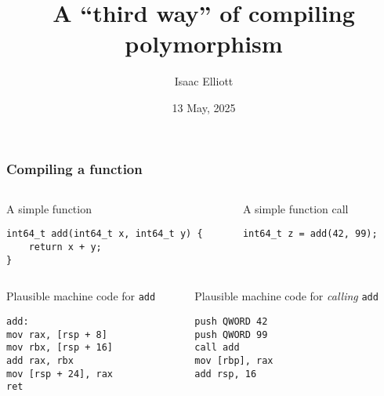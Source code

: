 \documentclass[t]{beamer}
\title{A ``third way'' of compiling polymorphism}
\author{Isaac Elliott}
\date{13 May, 2025}
\begin{document}
\frame{\titlepage}


\begin{frame}[fragile]
\frametitle{Compiling a function}

\begin{columns}
\begin{column}{0.48\textwidth}
\begin{block}{A simple function}
\footnotesize
\begin{verbatim}
int64_t add(int64_t x, int64_t y) {
    return x + y;
}
\end{verbatim}
\end{block}
\end{column}

\begin{column}{0.48\textwidth}
\begin{block}{A simple function call}
\begin{verbatim}
int64_t z = add(42, 99);
\end{verbatim}
\end{block}
\end{column}
\end{columns}

\begin{columns}

\pause

\begin{column}{0.48\textwidth}
\begin{block}{Plausible machine code for \texttt{add}}
\begin{verbatim}
add:
mov rax, [rsp + 8]
mov rbx, [rsp + 16]
add rax, rbx
mov [rsp + 24], rax
ret
\end{verbatim}
\end{block}
\end{column}

\begin{column}{0.48\textwidth}
\begin{block}{Plausible machine code for \textit{calling} \texttt{add}}
\begin{verbatim}
push QWORD 42
push QWORD 99
call add
mov [rbp], rax
add rsp, 16
\end{verbatim}
\end{block}
\end{column}
\end{columns}

\end{frame}
\end{document}
